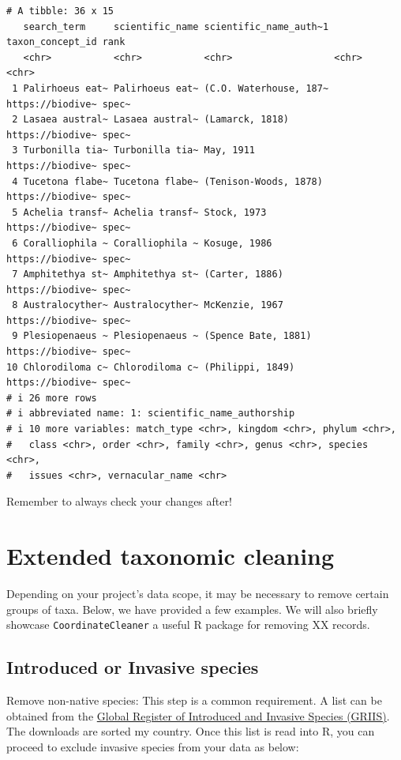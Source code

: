 \documentclass[
  letterpaper,
  DIV=11,
  numbers=noendperiod,
  oneside]{scrreprt}
\begin{document}
\begin{verbatim}
# A tibble: 36 x 15
   search_term     scientific_name scientific_name_auth~1 taxon_concept_id rank 
   <chr>           <chr>           <chr>                  <chr>            <chr>
 1 Palirhoeus eat~ Palirhoeus eat~ (C.O. Waterhouse, 187~ https://biodive~ spec~
 2 Lasaea austral~ Lasaea austral~ (Lamarck, 1818)        https://biodive~ spec~
 3 Turbonilla tia~ Turbonilla tia~ May, 1911              https://biodive~ spec~
 4 Tucetona flabe~ Tucetona flabe~ (Tenison-Woods, 1878)  https://biodive~ spec~
 5 Achelia transf~ Achelia transf~ Stock, 1973            https://biodive~ spec~
 6 Coralliophila ~ Coralliophila ~ Kosuge, 1986           https://biodive~ spec~
 7 Amphitethya st~ Amphitethya st~ (Carter, 1886)         https://biodive~ spec~
 8 Australocyther~ Australocyther~ McKenzie, 1967         https://biodive~ spec~
 9 Plesiopenaeus ~ Plesiopenaeus ~ (Spence Bate, 1881)    https://biodive~ spec~
10 Chlorodiloma c~ Chlorodiloma c~ (Philippi, 1849)       https://biodive~ spec~
# i 26 more rows
# i abbreviated name: 1: scientific_name_authorship
# i 10 more variables: match_type <chr>, kingdom <chr>, phylum <chr>,
#   class <chr>, order <chr>, family <chr>, genus <chr>, species <chr>,
#   issues <chr>, vernacular_name <chr>
\end{verbatim}

Remember to always check your changes after!

\hypertarget{extended-taxonomic-cleaning}{%
\section{Extended taxonomic
cleaning}\label{extended-taxonomic-cleaning}}

Depending on your project's data scope, it may be necessary to remove
certain groups of taxa. Below, we have provided a few examples. We will
also briefly showcase \texttt{CoordinateCleaner} a useful R package for
removing XX records.

\hypertarget{introduced-or-invasive-species}{%
\subsection{Introduced or Invasive
species}\label{introduced-or-invasive-species}}

Remove non-native species: This step is a common requirement. A list can
be obtained from the \href{https://griis.org/download}{Global Register
of Introduced and Invasive Species (GRIIS)}. The downloads are sorted my
country. Once this list is read into R, you can proceed to exclude
invasive species from your data as below:
\end{document}
